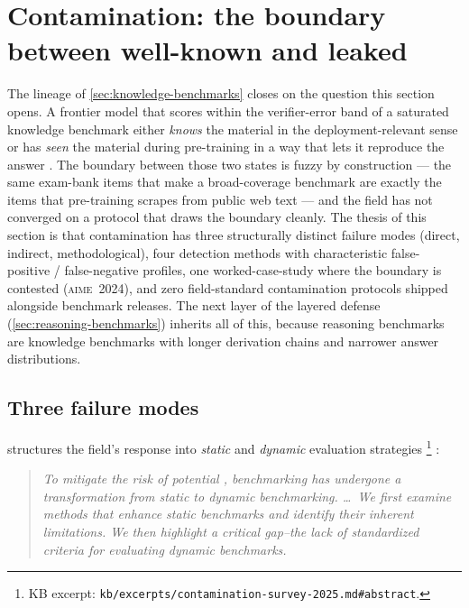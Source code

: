 
\section{Contamination: the boundary between well-known and leaked}
\label{sec:contamination}

The  lineage of \cref{sec:knowledge-benchmarks} closes on the
question this section opens. A frontier model that scores within the
verifier-error band of a saturated knowledge benchmark either
\emph{knows} the material in the deployment-relevant sense or has
\emph{seen} the material during pre-training in a way that lets it
reproduce the answer . The boundary between those two states is
fuzzy by construction --- the same exam-bank items that make  a
broad-coverage benchmark are exactly the items that pre-training
scrapes from public web text --- and the field has not converged on a
protocol that draws the boundary cleanly. The thesis of this section
is that contamination has three structurally distinct failure modes
(direct, indirect, methodological), four detection methods with
characteristic false-positive / false-negative profiles, one
worked-case-study where the boundary is contested
(\textsc{aime~2024}), and zero field-standard contamination protocols
shipped alongside benchmark releases. The next layer of the layered
defense (\cref{sec:reasoning-benchmarks}) inherits all of this, because
reasoning benchmarks are knowledge benchmarks with longer derivation
chains and narrower answer distributions.

\subsection{Three failure modes}
\label{sec:contamination-modes}

\citet{contamination-survey-2025} structures the field's response into
\emph{static} and \emph{dynamic} evaluation strategies%
\footnote{KB excerpt: \nolinkurl{kb/excerpts/contamination-survey-2025.md#abstract}.}
\citep[\S{}abstract]{contamination-survey-2025}:

\begin{quote}\itshape
To mitigate the risk of potential ,  benchmarking
has undergone a transformation from static to dynamic benchmarking.
\ldots\ We first examine methods that enhance static benchmarks and
identify their inherent limitations. We then highlight a critical
gap--the lack of standardized criteria for evaluating dynamic
benchmarks.
\end{quote}

